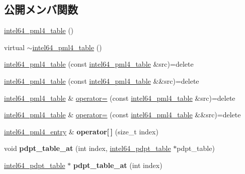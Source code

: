\subsection*{公開メンバ関数}
\begin{DoxyCompactItemize}
\item 
\hyperlink{classintel64__pml4__table_a7adfe75831c29123302f378a061a076e}{intel64\+\_\+pml4\+\_\+table} ()
\item 
virtual \hyperlink{classintel64__pml4__table_ab74e8b2b58fe884d3b9f1e9bd1342fbb}{$\sim$intel64\+\_\+pml4\+\_\+table} ()
\item 
\hyperlink{classintel64__pml4__table_aa6ec87ce70b16782b7aefa3e644bc7d5}{intel64\+\_\+pml4\+\_\+table} (const \hyperlink{classintel64__pml4__table}{intel64\+\_\+pml4\+\_\+table} \&src)=delete
\item 
\hyperlink{classintel64__pml4__table_ac15155f86c99fb627ce4c2201f519eaa}{intel64\+\_\+pml4\+\_\+table} (const \hyperlink{classintel64__pml4__table}{intel64\+\_\+pml4\+\_\+table} \&\&src)=delete
\item 
\hyperlink{classintel64__pml4__table}{intel64\+\_\+pml4\+\_\+table} \& \hyperlink{classintel64__pml4__table_a8c2591c5781c0db67ad0e44839f9d5a6}{operator=} (const \hyperlink{classintel64__pml4__table}{intel64\+\_\+pml4\+\_\+table} \&src)=delete
\item 
\hyperlink{classintel64__pml4__table}{intel64\+\_\+pml4\+\_\+table} \& \hyperlink{classintel64__pml4__table_a3f80097387464f4404300ba83c14eca4}{operator=} (const \hyperlink{classintel64__pml4__table}{intel64\+\_\+pml4\+\_\+table} \&\&src)=delete
\item 
\hypertarget{classintel64__pml4__table_a881b66a7e29b2568f0e91c158079e895}{}\label{classintel64__pml4__table_a881b66a7e29b2568f0e91c158079e895} 
\hyperlink{classintel64__pml4__entry}{intel64\+\_\+pml4\+\_\+entry} \& {\bfseries operator\mbox{[}$\,$\mbox{]}} (size\+\_\+t index)
\item 
\hypertarget{classintel64__pml4__table_ad908691745e01f82a122a41f714cce00}{}\label{classintel64__pml4__table_ad908691745e01f82a122a41f714cce00} 
void {\bfseries pdpt\+\_\+table\+\_\+at} (int index, \hyperlink{classintel64__pdpt__table}{intel64\+\_\+pdpt\+\_\+table} $\ast$pdpt\+\_\+table)
\item 
\hypertarget{classintel64__pml4__table_a68b892916fdb229f5257cb6c5647ea52}{}\label{classintel64__pml4__table_a68b892916fdb229f5257cb6c5647ea52} 
\hyperlink{classintel64__pdpt__table}{intel64\+\_\+pdpt\+\_\+table} $\ast$ {\bfseries pdpt\+\_\+table\+\_\+at} (int index)
\end{DoxyCompactItemize}
